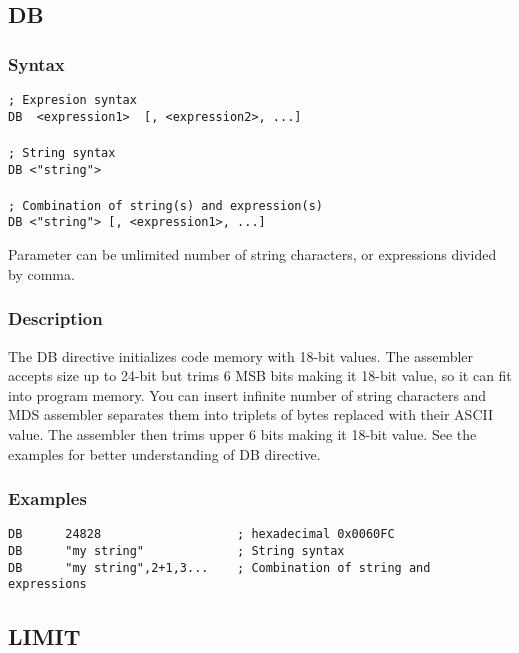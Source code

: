     \subsection{DB}
        \subsubsection{Syntax}
            \verb'; Expresion syntax'\\
            \verb'DB  <expression1>  [, <expression2>, ...]'\\
            \verb''\\
            \verb'; String syntax'\\
            \verb'DB <"string">'\\
            \verb''\\
            \verb'; Combination of string(s) and expression(s)'\\
            \verb'DB <"string"> [, <expression1>, ...]'

            Parameter can be unlimited number of string characters, or expressions divided by comma.

        \subsubsection{Description}
            The DB directive initializes code memory with 18-bit values. The assembler accepts size up to 24-bit but trims 6 MSB bits making it 18-bit value,
            so it can fit into program memory. You can insert infinite number of string characters and MDS assembler separates them into triplets of bytes replaced
            with their ASCII value. The assembler then trims upper 6 bits making it 18-bit value.
            See the examples for better understanding of DB directive.

        \subsubsection{Examples}
            \verb'DB      24828                   ; hexadecimal 0x0060FC'\\
            \verb'DB      "my string"             ; String syntax'\\
            \verb'DB      "my string",2+1,3...    ; Combination of string and expressions'\\

    \subsection{LIMIT}
